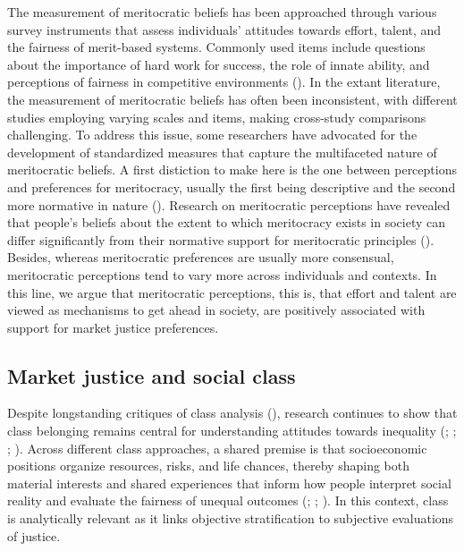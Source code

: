 \documentclass[
  12pt,
]{article}
\begin{document}
The measurement of meritocratic beliefs has been approached through
various survey instruments that assess individuals' attitudes towards
effort, talent, and the fairness of merit-based systems. Commonly used
items include questions about the importance of hard work for success,
the role of innate ability, and perceptions of fairness in competitive
environments (). In the extant literature, the measurement of meritocratic
beliefs has often been inconsistent, with different studies employing
varying scales and items, making cross-study comparisons challenging. To
address this issue, some researchers have advocated for the development
of standardized measures that capture the multifaceted nature of
meritocratic beliefs. A first distiction to make here is the one between
perceptions and preferences for meritocracy, usually the first being
descriptive and the second more normative in nature
().
Research on meritocratic perceptions have revealed that people's beliefs
about the extent to which meritocracy exists in society can differ
significantly from their normative support for meritocratic principles
().
Besides, whereas meritocratic preferences are usually more consensual,
meritocratic perceptions tend to vary more across individuals and
contexts. In this line, we argue that meritocratic perceptions, this is,
that effort and talent are viewed as mechanisms to get ahead in society,
are positively associated with support for market justice preferences.

\subsection{Market justice and social
class}\label{market-justice-and-social-class}

Despite longstanding critiques of class analysis
(), research
continues to show that class belonging remains central for understanding
attitudes towards inequality
(;
;
;
). Across
different class approaches, a shared premise is that socioeconomic
positions organize resources, risks, and life chances, thereby shaping
both material interests and shared experiences that inform how people
interpret social reality and evaluate the fairness of unequal outcomes
(;
;
). In this context,
class is analytically relevant as it links objective stratification to
subjective evaluations of justice.
\end{document}
